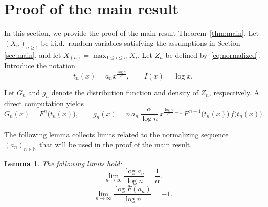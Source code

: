 \documentclass[11pt,reqno]{amsart}
\newtheorem{lemma}[theorem]{Lemma}
\theoremstyle{definition}
\theoremstyle{remark}
\numberwithin{equation}{section}
\begin{document}
\section{Proof of the main result}\label{sec:proof}
In this section, we provide the proof of the main result Theorem~\ref{thm:main}. 
Let $(X_n)_{n\ge1}$ be i.i.d.\ random variables satisfying the assumptions in Section \ref{sec:main}, and let $X_{(n)}=\max_{1\le i\le n} X_i$. 
Let $Z_n$ be defined by~\eqref{eq:normalized}. Introduce the notation
\[
t_n(x)=a_n x^{\frac{\log n}{\alpha}},
\qquad
I(x)=\log x.
\]

Let $G_n$ and $g_n$ denote the distribution function and density of $Z_n$, respectively. A direct computation yields
\begin{equation}\label{eq:distribution}
G_n(x)=F^n\bigl(t_n(x)\bigr),
\qquad
g_n(x)=n\,a_n\,\frac{\alpha}{\log n}\,
x^{\frac{\log n}{\alpha}-1}\,
F^{\,n-1}\!\bigl(t_n(x)\bigr)\,
f\!\bigl(t_n(x)\bigr).
\end{equation}

The following lemma collects limits related to the normalizing sequence
$(a_n)_{n\in\mathbb{N}}$ that will be used in the proof of the main result.

\begin{lemma}\label{lem:an}
The following limits hold:
\begin{equation}\label{eq:an-log}
\lim_{n\to\infty}\frac{\log a_n}{\log n}=\frac{1}{\alpha}.
\end{equation}
\begin{equation}\label{eq:fan-log}
\lim_{n\to\infty}\frac{\log \bar{F}(a_n)}{\log n}=-1.
\end{equation}
\end{lemma}
\end{document}
